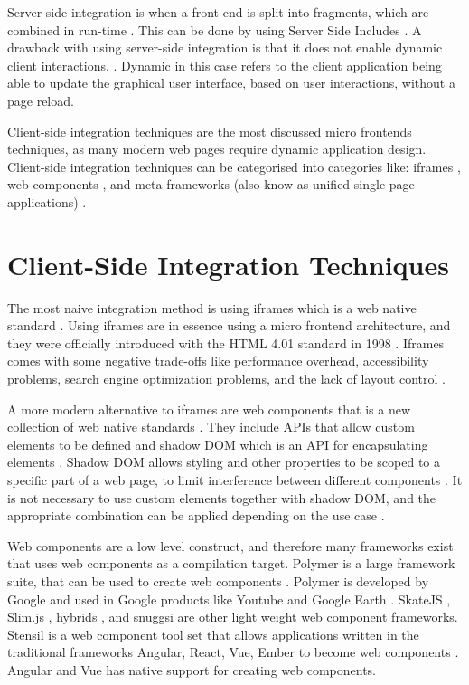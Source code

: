 Server-side integration is when a front end is split into fragments, which are combined in run-time \cite{Jackson2019, Geers2020}. This can be done by using Server Side Includes \cite{Geers2020,Jackson2019,Fagan}. A drawback with using server-side integration is that it does not enable dynamic client interactions. \cite[ch.~4]{Geers2020}. Dynamic in this case refers to the client application being able to update the graphical user interface, based on user interactions, without a page reload.

Client-side integration techniques are the most discussed micro frontends techniques, as many modern web pages require dynamic application design. Client-side integration techniques can be categorised into categories like: iframes \cites{Jackson2019}[ch.~2]{Geers2020}, web components \cites{Jackson2019}[ch.~5]{Geers2020}, and meta frameworks (also know as unified single page applications) \cite[ch.~6]{Geers2020}.


\section{Client-Side Integration Techniques}

The most naive integration method is using iframes which is a web native standard \cites{Jackson2019}[ch.~2]{Geers2020}. Using iframes are in essence using a micro frontend architecture, and they were officially introduced with the HTML 4.01 standard in 1998 \cite{Raggett1999}. Iframes comes with some negative trade-offs like performance overhead, accessibility problems, search engine optimization problems, and the lack of layout control \cite[ch.~2]{Geers2020}.

A more modern alternative to iframes are web components that is a new collection of web native standards \cite{MDNWebDocs}. They include APIs that allow custom elements to be defined and shadow DOM which is an API for encapsulating elements \cite{MDNWebDocs}. Shadow DOM allows styling and other properties to be scoped to a specific part of a web page, to limit interference between different components \cite{WebComponents.org}. It is not necessary to use custom elements together with shadow DOM, and the appropriate combination can be applied depending on the use case \cite{Geers2020}.

Web components are a low level construct, and therefore many frameworks exist that uses web components as a compilation target. Polymer is a large framework suite, that can be used to create web components \cite{ThePolymerProject,ThePolymerProjecta}. Polymer is developed by Google \cite{ThePolymerProjectb} and used in Google products like Youtube and Google Earth \cite{ThePolymerProjectc}. SkateJS \cite{SkateJS}, Slim.js \cite{Slim.js,Slim.jsa}, hybrids \cite{Lubanski}, and snuggsi \cite{DevPunks} are other light weight web component frameworks. Stensil is a web component tool set that allows applications written in the traditional frameworks Angular, React, Vue, Ember to become web components \cite{StencilJS}. Angular \cite{Googlec} and Vue \cite{Vuejs} has native support for creating web components.

